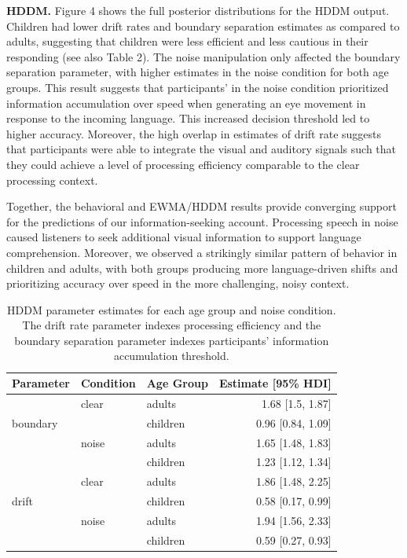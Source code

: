 \documentclass[10pt, letterpaper]{article}
\begin{document}
\textbf{HDDM.} Figure 4 shows the full posterior distributions for the
HDDM output. Children had lower drift rates and boundary separation
estimates as compared to adults, suggesting that children were less
efficient and less cautious in their responding (see also Table 2). The
noise manipulation only affected the boundary separation parameter, with
higher estimates in the noise condition for both age groups. This result
suggests that participants' in the noise condition prioritized
information accumulation over speed when generating an eye movement in
response to the incoming language. This increased decision threshold led
to higher accuracy. Moreover, the high overlap in estimates of drift
rate suggests that participants were able to integrate the visual and
auditory signals such that they could achieve a level of processing
efficiency comparable to the clear processing context.

Together, the behavioral and EWMA/HDDM results provide converging
support for the predictions of our information-seeking account.
Processing speech in noise caused listeners to seek additional visual
information to support language comprehension. Moreover, we observed a
strikingly similar pattern of behavior in children and adults, with both
groups producing more language-driven shifts and prioritizing accuracy
over speed in the more challenging, noisy context.

\begin{table}[t]
\centering
\begin{tabular}{lllr}
  \hline
Parameter & Condition & Age Group & Estimate [95\% HDI] \\ 
  \hline
 & clear & adults & 1.68 [1.5, 1.87] \\ 
  boundary &  & children & 0.96 [0.84, 1.09] \\ 
   & noise & adults & 1.65 [1.48, 1.83] \\ 
   &  & children & 1.23 [1.12, 1.34] \\ 
   \hline
 & clear & adults & 1.86 [1.48, 2.25] \\ 
  drift &  & children & 0.58 [0.17, 0.99] \\ 
   & noise & adults & 1.94 [1.56, 2.33] \\ 
   &  & children & 0.59 [0.27, 0.93] \\ 
   \hline
\end{tabular}
\caption{HDDM parameter estimates for each age group and noise condition. The drift rate parameter indexes processing efficiency and the boundary separation parameter indexes participants' information accumulation threshold.} 
\end{table}
\end{document}
